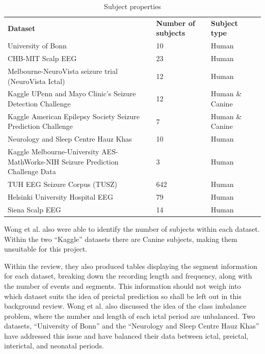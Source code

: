 \documentclass[12pt]{article}
\begin{document}
\begin{table}[H]
\centering
\begin{tabular}{p{}p{}p{}p{}}
\textbf{Dataset}                                                                & \textbf{Number of subjects} & \textbf{Subject type} & \textbf{} \\
University of Bonn                   & 10  & Human &  \\
CHB-MIT Scalp EEG                    & 23  & Human &  \\
Melbourne-NeuroVista seizure trial (NeuroVista Ictal)                           & 12                          & Human                 &           \\
Kaggle UPenn and Mayo Clinic's Seizure Detection Challenge                      & 12                          & Human \& Canine       &           \\
Kaggle American Epilepsy Society Seizure Prediction Challenge                   & 7                           & Human \& Canine       &           \\
Neurology and Sleep Centre Hauz Khas & 10  & Human &  \\
Kaggle Melbourne-University AES-MathWorks-NIH Seizure Prediction Challenge Data & 3                           & Human                 &           \\
TUH EEG Seizure Corpus (TUSZ)        & 642 & Human &  \\
Helsinki University Hospital EEG     & 79  & Human &  \\
Siena Scalp EEG                      & 14  & Human & 
\end{tabular}
\caption{Subject properties}
\end{table}

Wong et al. also were able to identify the number of subjects within each dataset. Within the two ``Kaggle'' datasets there are Canine subjects, making them unsuitable for this project. 

Within the review, they also produced tables displaying the segment information for each dataset, breaking down the recording length and frequency, along with the number of events and segments. This information should not weigh into which dataset suits the idea of preictal prediction so shall be left out in this background review. Wong et al. also discussed the idea of the class imbalance problem, where the number and length of each ictal period are unbalanced. Two datasets, ``University of Bonn'' and the ``Neurology and Sleep Centre Hauz Khas'' have addressed this issue and have balanced their data between ictal, preictal, interictal, and neonatal periods.
\end{document}
